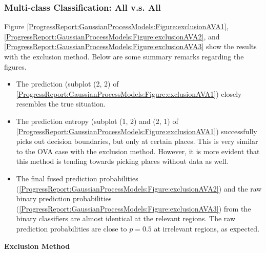 				\FloatBarrier
				
			\subsubsection{Multi-class Classification: All v.s. All}

				Figure \ref{ProgressReport:GaussianProcessModels:Figure:exclusionAVA1}, \ref{ProgressReport:GaussianProcessModels:Figure:exclusionAVA2}, and \ref{ProgressReport:GaussianProcessModels:Figure:exclusionAVA3} show the results with the exclusion method. Below are some summary remarks regarding the figures.
				
				\begin{itemize}
					\item The prediction (subplot (2, 2) of \cref{ProgressReport:GaussianProcessModels:Figure:exclusionAVA1}) closely resembles the true situation.
					\item The prediction entropy (subplot (1, 2) and (2, 1) of \cref{ProgressReport:GaussianProcessModels:Figure:exclusionAVA1}) successfully picks out decision boundaries, but only at certain places. This is very similar to the OVA case with the exclusion method. However, it is more evident that this method is tending towards picking places without data as well.
					\item The final fused prediction probabilities (\cref{ProgressReport:GaussianProcessModels:Figure:exclusionAVA2}) and the raw binary prediction probabilities (\cref{ProgressReport:GaussianProcessModels:Figure:exclusionAVA3}) from the binary classifiers are almost identical at the relevant regions. The raw prediction probabilities are close to $p = 0.5$ at irrelevant regions, as expected.
				\end{itemize}
				
				\textbf{Exclusion Method}
				
